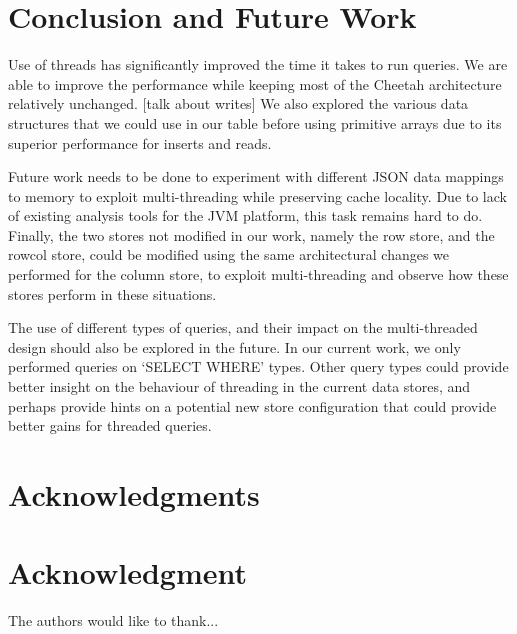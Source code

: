 \documentclass[11pt,journal,compsoc]{IEEEtran}
\begin{document}
\section{Conclusion and Future Work}
Use of threads has significantly improved the time it takes to run queries. We are able to improve the performance while keeping most of the Cheetah architecture relatively unchanged. [talk about writes] We also explored the various data structures that we could use in our table before using primitive arrays due to its superior performance for inserts and reads.

Future work needs to be done to experiment with different JSON data mappings to memory to exploit multi-threading while preserving cache locality. Due to lack of existing analysis tools for the JVM platform, this task remains hard to do.  Finally, the two  stores not modified in our work, namely the row store, and the rowcol store, could be modified using the same architectural changes we performed for the column store, to exploit multi-threading and observe how these stores perform in these situations.

The use of different types of queries, and their impact on the multi-threaded design should also be explored in the future. In our current work, we only performed queries on ‘SELECT WHERE’ types. Other query types could provide better insight on the behaviour of threading in the current data stores, and perhaps provide hints on a potential new store configuration that could provide better gains for threaded queries. 

\ifCLASSOPTIONcompsoc
  \section*{Acknowledgments}
\else
  \section*{Acknowledgment}
\fi

The authors would like to thank...

\ifCLASSOPTIONcaptionsoff
  \newpage
\fi




%
%
%




\end{document}
